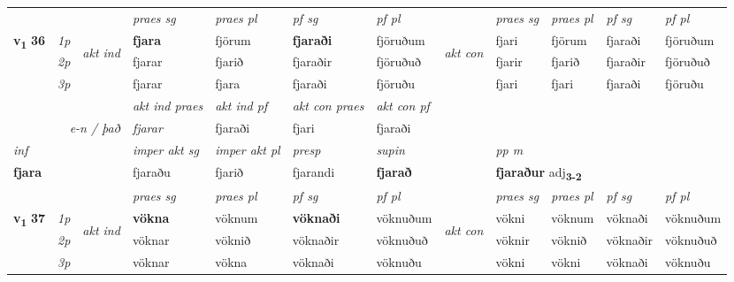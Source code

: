 \begin{longtable}[l]{X>{\footnotesize\itshape}llXXXXlXXXX}
 & &   & \textit{praes sg}  & \textit{praes pl}    & \textit{ pf sg} & \textit{pf pl} & & \textit{praes sg}  & \textit{praes pl}    & \textit{pf sg} & \textit{pf pl }  \\ \cmidrule{4-7} \cmidrule{9-12}
 \multirow{2}{*}{{{\textbf{v{\textsubscript{1}}} \Large{\textbf{36}}}}}  & 1p & \multirow{3}{*}{\begin{turn}{90}\textit{akt ind}\end{turn}} & \textbf{fjara} & fjörum & \textbf{fjaraði} & fjöruðum & \multirow{3}{*}{\begin{turn}{90}\textit{akt con}\end{turn}} &fjari & fjörum & fjaraði & fjöruðum\\*
 & 2p &  &  fjarar  & fjarið & fjaraðir & fjöruðuð & & fjarir & fjarið & fjaraðir & fjöruðuð \\*
 & 3p &  & fjarar & fjara & fjaraði & fjöruðu & & fjari & fjari& fjaraði & fjöruðu \\*
\cmidrule{4-7} \cmidrule{9-12}

   && &  \textit{akt ind praes} & \textit{akt ind pf} & \textit{akt con praes} & \textit{akt con pf} \\*
\multicolumn{3}{r}{\textit{e-n / það}} & fjarar & fjaraði & fjari & fjaraði \\*

\cmidrule{4-7}
   {\textit{inf}} & &  & \textit{imper akt sg} & \textit{imper akt pl}   & \textit{presp} & \textit{supin}  && \textit{pp m} \\*
  {\textbf{fjara}} & && fjaraðu  & fjarið   & fjarandi &  \textbf{fjarað}  && \multicolumn{2}{l}{\textbf{fjaraður} adj\textbf{\textsubscript{3-2}}} \\*

\midrule

 & &   & \textit{praes sg}  & \textit{praes pl}    & \textit{ pf sg} & \textit{pf pl} & & \textit{praes sg}  & \textit{praes pl}    & \textit{pf sg} & \textit{pf pl }  \\ \cmidrule{4-7} \cmidrule{9-12}
 \multirow{2}{*}{{{\textbf{v{\textsubscript{1}}} \Large{\textbf{37}}}}}  & 1p & \multirow{3}{*}{\begin{turn}{90}\textit{akt ind}\end{turn}} & \textbf{vökna} & vöknum & \textbf{vöknaði} & vöknuðum & \multirow{3}{*}{\begin{turn}{90}\textit{akt con}\end{turn}} &vökni & vöknum & vöknaði & vöknuðum\\*
 & 2p &  &  vöknar  & vöknið & vöknaðir & vöknuðuð & & vöknir & vöknið & vöknaðir & vöknuðuð \\*
 & 3p &  & vöknar & vökna & vöknaði & vöknuðu & & vökni & vökni& vöknaði & vöknuðu \\*
\cmidrule{4-7} \cmidrule{9-12}


\end{longtable}

